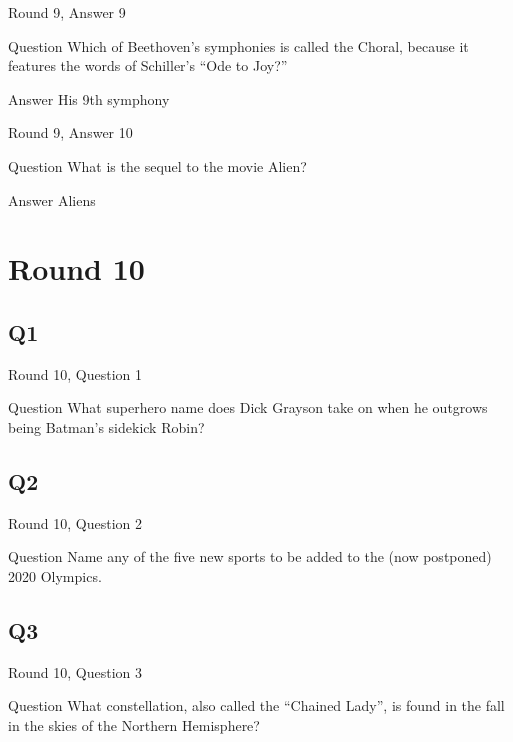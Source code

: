 \documentclass[11pt]{beamer}
\begin{document}
\begin{frame}[t]{Round 9, Answer 9}
\vspace{2em}
\begin{block}{Question}
Which of Beethoven's symphonies is called the Choral, because it features the words of Schiller's ``Ode to Joy?''
\end{block}
\pause{}
\begin{block}{Answer}
His 9th symphony
\end{block}
\end{frame}
    

\begin{frame}[t]{Round 9, Answer 10}
\vspace{2em}
\begin{block}{Question}
What is the sequel to the movie Alien\@?
\end{block}
\pause{}
\begin{block}{Answer}
Aliens
\end{block}
\end{frame}
    

\section{Round 10}
    

\subsection*{Q1}
\begin{frame}[t]{Round 10, Question 1}
\vspace{2em}
\begin{block}{Question}
What superhero name does Dick Grayson take on when he outgrows being Batman's sidekick Robin\@?
\end{block}
\end{frame}
    

\subsection*{Q2}
\begin{frame}[t]{Round 10, Question 2}
\vspace{2em}
\begin{block}{Question}
Name any of the five new sports to be added to the (now postponed) 2020 Olympics.
\end{block}
\end{frame}
    

\subsection*{Q3}
\begin{frame}[t]{Round 10, Question 3}
\vspace{2em}
\begin{block}{Question}
What constellation, also called the ``Chained Lady'', is found in the fall in the skies of the Northern Hemisphere\@?
\end{block}
\end{frame}
    
\end{document}
